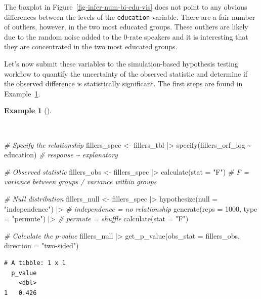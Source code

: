 \documentclass[
  letterpaper,
]{book}
\newenvironment{Shaded}{\begin{snugshade}}{\end{snugshade}}
\newcommand{\AttributeTok}[1]{\textcolor[rgb]{0.00,0.00,0.00}{#1}}
\newcommand{\CommentTok}[1]{\textcolor[rgb]{0.00,0.00,0.00}{\textit{#1}}}
\newcommand{\DecValTok}[1]{\textcolor[rgb]{0.00,0.00,0.00}{#1}}
\newcommand{\FunctionTok}[1]{\textcolor[rgb]{0.00,0.00,0.00}{#1}}
\newcommand{\NormalTok}[1]{\textcolor[rgb]{0.00,0.00,0.00}{#1}}
\newcommand{\OtherTok}[1]{\textcolor[rgb]{0.00,0.00,0.00}{#1}}
\newcommand{\SpecialCharTok}[1]{\textcolor[rgb]{0.00,0.00,0.00}{#1}}
\newcommand{\StringTok}[1]{\textcolor[rgb]{0.00,0.00,0.00}{#1}}
\theoremstyle{definition}
\newtheorem{example}{Example}[chapter]
\theoremstyle{remark}
\begin{document}
The boxplot in Figure~\ref{fig-infer-num-bi-edu-vis} does not point to
any obvious differences between the levels of the \texttt{education}
variable. There are a fair number of outliers, however, in the two most
educated groups. These outliers are likely due to the random noise added
to the 0-rate speakers and it is interesting that they are concentrated
in the two most educated groups.

Let's now submit these variables to the simulation-based hypothesis
testing workflow to quantify the uncertainty of the observed statistic
and determine if the observed difference is statistically significant.
The first steps are found in Example~\ref{exm-infer-num-bi-edu}.

\begin{example}[]\protect\hypertarget{exm-infer-num-bi-edu}{}\label{exm-infer-num-bi-edu}

~

\begin{Shaded}
\begin{Highlighting}[]
\CommentTok{\# Specify the relationship}
\NormalTok{fillers\_spec }\OtherTok{\textless{}{-}}
\NormalTok{  fillers\_tbl }\SpecialCharTok{|\textgreater{}}
  \FunctionTok{specify}\NormalTok{(fillers\_orf\_log }\SpecialCharTok{\textasciitilde{}}\NormalTok{ education) }\CommentTok{\# response \textasciitilde{} explanatory}

\CommentTok{\# Observed statistic}
\NormalTok{fillers\_obs }\OtherTok{\textless{}{-}}
\NormalTok{  fillers\_spec }\SpecialCharTok{|\textgreater{}}
  \FunctionTok{calculate}\NormalTok{(}\AttributeTok{stat =} \StringTok{"F"}\NormalTok{) }\CommentTok{\# F = variance between groups / variance within groups}

\CommentTok{\# Null distribution}
\NormalTok{fillers\_null }\OtherTok{\textless{}{-}}
\NormalTok{  fillers\_spec }\SpecialCharTok{|\textgreater{}}
  \FunctionTok{hypothesize}\NormalTok{(}\AttributeTok{null =} \StringTok{"independence"}\NormalTok{) }\SpecialCharTok{|\textgreater{}} \CommentTok{\# independence = no relationship}
  \FunctionTok{generate}\NormalTok{(}\AttributeTok{reps =} \DecValTok{1000}\NormalTok{, }\AttributeTok{type =} \StringTok{"permute"}\NormalTok{) }\SpecialCharTok{|\textgreater{}} \CommentTok{\# permute = shuffle}
  \FunctionTok{calculate}\NormalTok{(}\AttributeTok{stat =} \StringTok{"F"}\NormalTok{)}

\CommentTok{\# Calculate the $p${-}value}
\NormalTok{fillers\_null }\SpecialCharTok{|\textgreater{}}
  \FunctionTok{get\_p\_value}\NormalTok{(}\AttributeTok{obs\_stat =}\NormalTok{ fillers\_obs, }\AttributeTok{direction =} \StringTok{"two{-}sided"}\NormalTok{)}
\end{Highlighting}
\end{Shaded}

\begin{verbatim}
# A tibble: 1 x 1
  p_value
    <dbl>
1   0.426
\end{verbatim}

\end{example}
\end{document}
